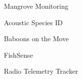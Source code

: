\item Mangrove Monitoring
\item Acoustic Species ID
\item Baboons on the Move
\item FishSense
\item Radio Telemetry Tracker